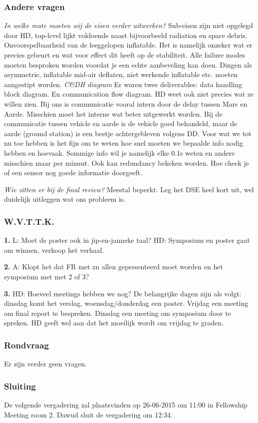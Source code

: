 \subsubsection{Andere vragen}
\textit{In welke mate moeten wij de eisen verder uitwerken?} Sub-eisen zijn niet opgelegd door HD, top-level lijkt voldoende naast bijvoorbeeld radiation en space debris.
\newline\newline
Onvoorspelbaarheid van de leeggelopen inflatable. Het is namelijk onzeker wat er precies gebeurt en wat voor effect dit heeft op de stabiliteit. Alle failure modes moeten besproken worden voordat je een echte aanbeveling kan doen. Dingen als asymmetrie, inflatable mid-air deflaten, niet werkende inflatable etc. moeten aangestipt worden.
\newline\newline
\textit{C\&DH diagram} Er waren twee deliverables: data handling block diagram. En communication flow diagram. HD weet ook niet precies wat ze willen zien. Bij ons is communicatie vooral intern door de delay tussen Mars en Aarde. Misschien moet het interne wat beter uitgewerkt worden. Bij de communicatie tussen vehicle en aarde is de vehicle goed behandeld, maar de aarde (ground station) is een beetje achtergebleven volgens DD. Voor wat we tot nu toe hebben is het fijn om te weten hoe snel moeten we bepaalde info nodig hebben en hoevaak. Sommige info wil je namelijk elke 0.1s weten en andere misschien maar per minuut. Ook kan redundancy bekeken worden. Hoe check je of een sensor nog goede informatie doorgeeft.

\textit{Wie zitten er bij de final review?} Meestal beperkt. Leg het DSE heel kort uit, wel duidelijk uitleggen wat ons probleem is.

\subsubsection{W.V.T.T.K.}
\textbf{1.} L: Moet de poster ook in jip-en-janneke taal? HD: Symposium en poster gaat om winnen, verkoop het verhaal.

\textbf{2.} A: Klopt het dat FR met zn allen gepresenteerd moet worden en het symposium met met 2 of 3?

\textbf{3.} HD: Hoeveel meetings hebben we nog? De belangrijke dagen zijn als volgt: dinsdag komt het verslag, woensdag/donderdag een poster. Vrijdag een meeting om final report te bespreken. Dinsdag een meeting om symposium door te spreken. HD geeft wel aan dat het moeilijk wordt om vrijdag te graden. 

\subsubsection{Rondvraag}
Er zijn verder geen vragen.

\subsubsection{Sluiting}
De volgende vergadering zal plaatsvinden op 26-06-2015 om 11:00 in Fellowship Meeting room 2.
\newline\newline
Dawud sluit de vergadering om 12:34.